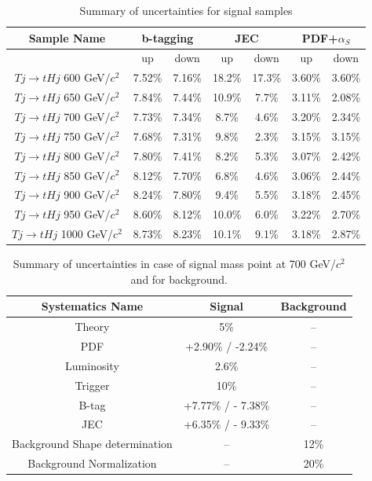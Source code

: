 \begin{table}[htbH]
\begin{center}
\begin{tabular}{|c|c|c|c|c|c|c|}
\hline 
Sample Name & \multicolumn{2}{c|}{b-tagging} & \multicolumn{2}{c|}{JEC} & \multicolumn{2}{c|}{PDF+$\alpha_{S}$}\\
\hline
 & up & down & up & down & up & down \\
\hline
$Tj\rightarrow tHj$ 600 GeV/$c^{2}$ & 7.52\% & 7.16\% & 18.2\% & 17.3\% & 3.60\% & 3.60\% \\
$Tj\rightarrow tHj$ 650 GeV/$c^{2}$ & 7.84\% & 7.44\% & 10.9\% & 7.7\% & 3.11\% & 2.08\% \\
$Tj\rightarrow tHj$ 700 GeV/$c^{2}$ & 7.73\% & 7.34\% & 8.7\% & 4.6\% & 3.20\% & 2.34\% \\
$Tj\rightarrow tHj$ 750 GeV/$c^{2}$ & 7.68\% & 7.31\% & 9.8\% & 2.3\% & 3.15\% & 3.15\% \\
$Tj\rightarrow tHj$ 800 GeV/$c^{2}$ & 7.80\% & 7.41\% & 8.2\% & 5.3\% & 3.07\% & 2.42\% \\
$Tj\rightarrow tHj$ 850 GeV/$c^{2}$ & 8.12\% & 7.70\% & 6.8\% & 4.6\% & 3.06\% & 2.44\% \\
$Tj\rightarrow tHj$ 900 GeV/$c^{2}$ & 8.24\% & 7.80\% & 9.4\% & 5.5\% & 3.18\% & 2.45\% \\
$Tj\rightarrow tHj$ 950 GeV/$c^{2}$ & 8.60\% & 8.12\% & 10.0\% & 6.0\% & 3.22\% & 2.70\% \\
$Tj\rightarrow tHj$ 1000 GeV/$c^{2}$ & 8.73\% & 8.23\% & 10.1\% & 9.1\% & 3.18\% & 2.87\% \\
\hline
\end{tabular}
\end{center}
\caption{Summary of uncertainties for signal samples\label{tab:sys}}
\end{table}\clearpage

\begin{table}[htbH]
\begin{center}
\begin{tabular}{|c|c|c|}
\hline 
Systematics Name & Signal & Background \\
\hline
Theory & 5\% & --\\
PDF & +2.90\% / -2.24\% & --\\
Luminosity & 2.6\% & --\\
Trigger & 10\% & --\\
B-tag & +7.77\% / - 7.38\% & --\\
JEC & +6.35\% / - 9.33\% & --\\
Background Shape determination & -- & 12\%\\
Background Normalization & -- & 20\%\\
\hline
\end{tabular}
\caption{Summary of uncertainties in case of signal mass point at
  700 GeV/$c^{2}$ and for background.\label{tab:sys700}}
\end{center}
\end{table}\clearpage

